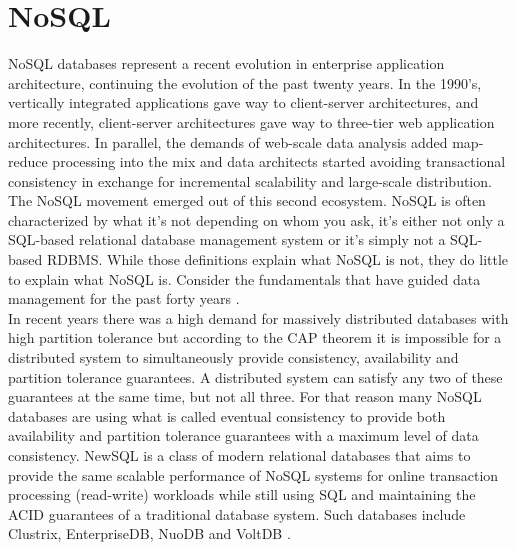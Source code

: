 \section{NoSQL}
\hspace*{0.7in} NoSQL databases represent a recent evolution in enterprise application architecture, continuing the evolution of the past twenty years. In the 1990's, vertically integrated applications gave way to client-server architectures, and more recently, client-server architectures gave way to three-tier web application architectures. In parallel, the demands of web-scale data analysis added map-reduce processing into the mix and data architects started avoiding transactional consistency in exchange for incremental scalability and large-scale distribution. The NoSQL movement emerged out of this second ecosystem. NoSQL is often characterized by what it's not depending on whom you ask, it's either not only a SQL-based relational database management system or it's simply not a SQL-based RDBMS. While those definitions explain what NoSQL is not, they do little to explain what NoSQL is. Consider the fundamentals that have guided data management for the past forty years \cite{3}.\\
\hspace*{0.7in} In recent years there was a high demand for massively distributed databases with high partition tolerance but according to the CAP theorem it is impossible for a distributed system to simultaneously provide consistency, availability and partition tolerance guarantees. A distributed system can satisfy any two of these guarantees at the same time, but not all three. For that reason many NoSQL databases are using what is called eventual consistency to provide both availability and partition tolerance guarantees with a maximum level of data consistency. NewSQL is a class of modern relational databases that aims to provide the same scalable performance of NoSQL systems for online transaction processing (read-write) workloads while still using SQL and maintaining the ACID guarantees of a traditional database system. Such databases include Clustrix, EnterpriseDB, NuoDB and VoltDB \cite{1}.
\\
